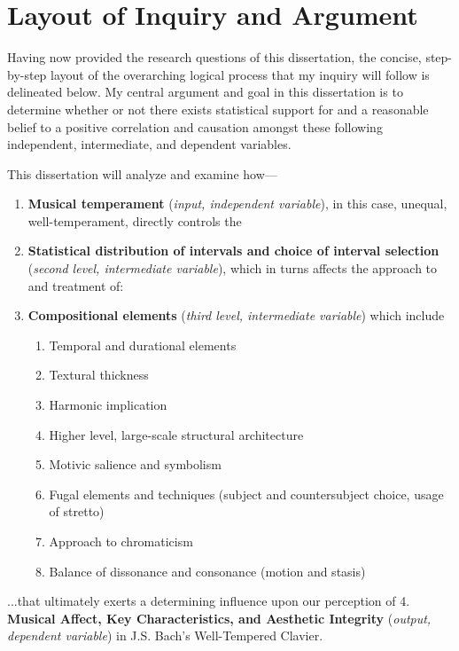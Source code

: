     \section{Layout of Inquiry and
Argument}\label{layout-of-inquiry-and-argument}

Having now provided the research questions of this dissertation, the
concise, step-by-step layout of the overarching logical process that my
inquiry will follow is delineated below. My central argument and goal in
this dissertation is to determine whether or not there exists
statistical support for and a reasonable belief to a positive
correlation and causation amongst these following independent,
intermediate, and dependent variables.

This dissertation will analyze and examine how---

\begin{enumerate}
\def\labelenumi{\arabic{enumi}.}
\tightlist
\item
  \textbf{Musical temperament} (\emph{input, independent variable}), in
  this case, unequal, well-temperament, directly controls the
\item
  \textbf{Statistical distribution of intervals and choice of interval
  selection} (\emph{second level, intermediate variable}), which in
  turns affects the approach to and treatment of:
\item
  \textbf{Compositional elements} (\emph{third level, intermediate
  variable}) which include

  \begin{enumerate}
  \def\labelenumii{\arabic{enumii}.}
  \tightlist
  \item
    Temporal and durational elements
  \item
    Textural thickness
  \item
    Harmonic implication
  \item
    Higher level, large-scale structural architecture
  \item
    Motivic salience and symbolism
  \item
    Fugal elements and techniques (subject and countersubject choice,
    usage of stretto)
  \item
    Approach to chromaticism
  \item
    Balance of dissonance and consonance (motion and stasis)
  \end{enumerate}
\end{enumerate}

...that ultimately exerts a determining influence upon our perception of
4. \textbf{Musical Affect, Key Characteristics, and Aesthetic Integrity}
(\emph{output, dependent variable}) in J.S. Bach's Well-Tempered
Clavier.

